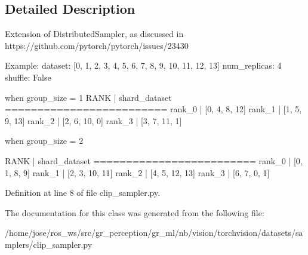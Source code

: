 \subsection{Detailed Description}
\begin{DoxyVerb}Extension of DistributedSampler, as discussed in
https://github.com/pytorch/pytorch/issues/23430

Example:
    dataset: [0, 1, 2, 3, 4, 5, 6, 7, 8, 9, 10, 11, 12, 13]
    num_replicas: 4
    shuffle: False

when group_size = 1
        RANK    |  shard_dataset
        =========================
        rank_0  |  [0, 4, 8, 12]
        rank_1  |  [1, 5, 9, 13]
        rank_2  |  [2, 6, 10, 0]
        rank_3  |  [3, 7, 11, 1]

when group_size = 2

        RANK    |  shard_dataset
        =========================
        rank_0  |  [0, 1, 8, 9]
        rank_1  |  [2, 3, 10, 11]
        rank_2  |  [4, 5, 12, 13]
        rank_3  |  [6, 7, 0, 1]\end{DoxyVerb}
 

Definition at line 8 of file clip\+\_\+sampler.\+py.



The documentation for this class was generated from the following file\+:\begin{DoxyCompactItemize}
\item 
/home/jose/ros\+\_\+ws/src/gr\+\_\+perception/gr\+\_\+ml/nb/vision/torchvision/datasets/samplers/clip\+\_\+sampler.\+py\end{DoxyCompactItemize}
